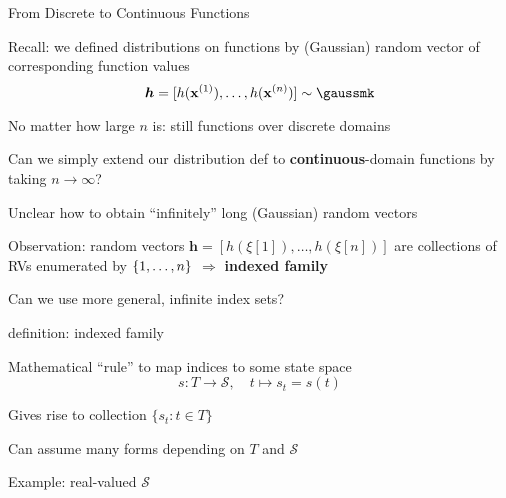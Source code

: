 \documentclass[11pt,compress,t,notes=noshow, xcolor=table]{beamer}
\begin{document}

\begin{framei}[sep = L]{From Discrete to Continuous Functions}
\item Recall: we defined distributions on functions by (Gaussian) random vector of corresponding function values 
$$\bm{h} = [h(\xi[1]), \dots, h(\xi[n])] \sim \gaussmk$$
\item No matter how large $n$ is: still functions over discrete domains
\item Can we simply extend our distribution def to \textbf{continuous}-domain functions by taking $n \rightarrow \infty$?
\item Unclear how to obtain ``infinitely'' long (Gaussian) random vectors
\item Observation: random vectors $\bm{h} = [h(\xi[1]), \dots, h(\xi[n])]$ are collections of RVs enumerated by $\{1, \ldots, n\}$ $\Rightarrow$ \textbf{indexed family} 
\item Can we use more general, infinite index sets?
\end{framei}

\begin{framei}{definition: indexed family}
\item Mathematical ``rule'' to map indices to some state space %
$$s: T \rightarrow \mathcal{S}, \quad t \mapsto s_t = s(t) $$
\item Gives rise to collection $\{s_t: t \in T\}$
\item Can assume many forms depending on $T$ and $\mathcal{S}$
\item Example: real-valued $\mathcal{S}$ 
\end{framei}
\end{document}
